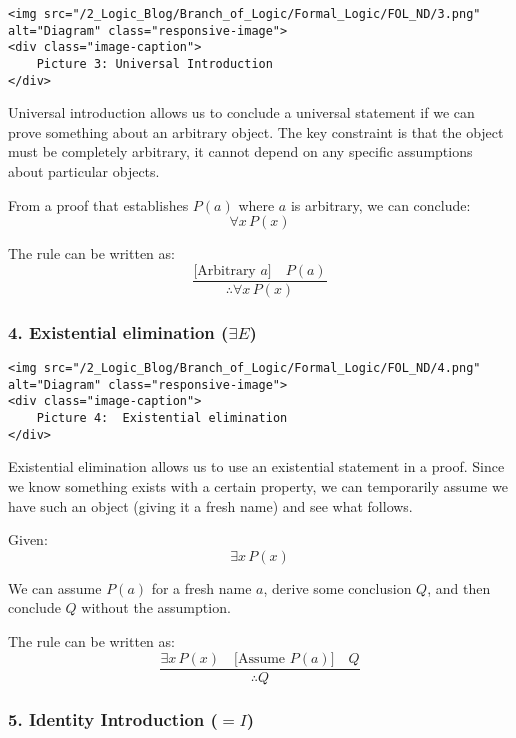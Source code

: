 \begin{verbatim}
<img src="/2_Logic_Blog/Branch_of_Logic/Formal_Logic/FOL_ND/3.png" alt="Diagram" class="responsive-image">
<div class="image-caption">
    Picture 3: Universal Introduction
</div>
\end{verbatim}

Universal introduction allows us to conclude a universal statement if we
can prove something about an arbitrary object. The key constraint is
that the object must be completely arbitrary, it cannot depend on any
specific assumptions about particular objects.

From a proof that establishes \(P(a)\) where \(a\) is arbitrary, we can
conclude: \[\forall x\, P(x)\]

The rule can be written as:
\[\frac{\text{[Arbitrary } a\text{]} \quad P(a)}{\therefore \forall x\, P(x)}\]

\subsubsection{\texorpdfstring{4. Existential elimination
(\(\exists E\))}{4. Existential elimination (\textbackslash exists E)}}\label{existential-elimination-exists-e}

\begin{verbatim}
<img src="/2_Logic_Blog/Branch_of_Logic/Formal_Logic/FOL_ND/4.png" alt="Diagram" class="responsive-image">
<div class="image-caption">
    Picture 4:  Existential elimination
</div>
\end{verbatim}

Existential elimination allows us to use an existential statement in a
proof. Since we know something exists with a certain property, we can
temporarily assume we have such an object (giving it a fresh name) and
see what follows.

Given: \[\exists x\, P(x)\]

We can assume \(P(a)\) for a fresh name \(a\), derive some conclusion
\(Q\), and then conclude \(Q\) without the assumption.

The rule can be written as:
\[\frac{\exists x\, P(x) \quad \text{[Assume } P(a)\text{]} \quad Q}{\therefore Q}\]

\subsubsection{\texorpdfstring{5. Identity Introduction
(\(=I\))}{5. Identity Introduction (=I)}}\label{identity-introduction-i}

